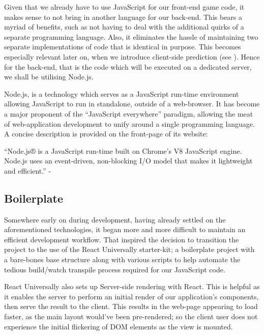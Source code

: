 \documentclass{standalone}
\begin{document}
			Given that we already have to use JavaScript for our front-end game code, it makes sense to not bring in another language for our back-end. This bears a myriad of benefits, such as not having to deal with the additional quirks of a separate programming language. Also, it eliminates the hassle of maintaining two separate implementations of code that is identical in purpose. This becomes especially relevant later on, when we introduce client-side prediction (see ). Hence for the back-end, that is the code which will be executed on a dedicated server, we shall be utilising Node.js\parencite{NodeJs}.

			Node.js, is a technology which serves as a JavaScript run-time environment allowing JavaScript to run in standalone, outside of a web-browser. It has become a major proponent of the \enquote{JavaScript everywhere} paradigm, allowing the meat of web-application development to unify around a single programming language. A concise description is provided on the front-page of its website:
			\begin{formal}
				\enquote{Node.js® is a JavaScript run-time built on Chrome's V8 JavaScript engine. Node.js uses an event-driven, non-blocking I/O model that makes it lightweight and efficient.} - \cite{NodeJs}
			\end{formal}

		\subsection{Boilerplate} \label{sec:boilerplate}
			Somewhere early on during development, having already settled on the aforementioned technologies, it began more and more difficult to maintain an efficient development workflow. That inspired the decision to transition the project to the use of the React Universally \parencite{ReactUniversally} starter-kit; a boilerplate project with a bare-bones base structure along with various scripts to help automate the tedious build/watch transpile process required for our JavaScript code.

			React Universally also sets up Server-side rendering with React. This is helpful as it enables the server to perform an initial render of our application's components, then serve the result to the client. This results in the web-page appearing to load faster, as the main layout would've been pre-rendered; so the client user does not experience the initial flickering of DOM elements as the view is mounted.
\end{document}
